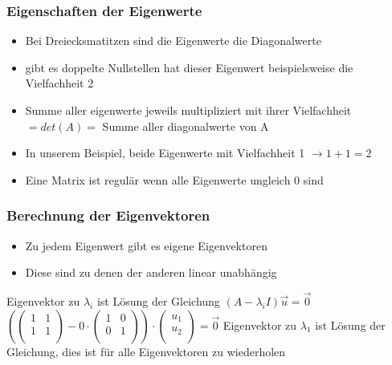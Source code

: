 \begin{frame}
    \frametitle{Eigenschaften der Eigenwerte}
    \begin{itemize}
        \item Bei Dreiecksmatitzen sind die Eigenwerte die Diagonalwerte
        \item gibt es doppelte Nullstellen hat dieser Eigenwert beispielsweise die Vielfachheit 2
        \item  Summe aller eigenwerte jeweils multipliziert mit ihrer Vielfachheit $= det(A) =$ Summe aller diagonalwerte von A
        \item In unserem Beispiel, beide Eigenwerte mit Vielfachheit 1 $\rightarrow 1+1 = 2$
        \item Eine Matrix ist regulär wenn alle Eigenwerte ungleich 0 sind
    \end{itemize}
\end{frame}
\begin{frame}
    \frametitle{Berechnung der Eigenvektoren}
    \begin{itemize}
        \item Zu jedem Eigenwert gibt es eigene Eigenvektoren
        \item Diese sind zu denen der anderen linear unabhängig
    \end{itemize}
    Eigenvektor zu $\lambda _{i}$ ist Lösung der Gleichung $(A - \lambda _{i} I) \vec{u} = \vec{0}$
    $(\begin{pmatrix}
        1 & 1 \\
        1 & 1 \\
    \end{pmatrix} - 0 \cdot \begin{pmatrix}
        1 & 0 \\
        0 & 1 \\
    \end{pmatrix}) \cdot \begin{pmatrix}
        u _{1} \\
        u _{2} \\
    \end{pmatrix} = \vec{0}$
    \newline
    Eigenvektor zu $\lambda _{1}$ ist Lösung der Gleichung, dies ist für alle Eigenvektoren zu wiederholen
\end{frame}

